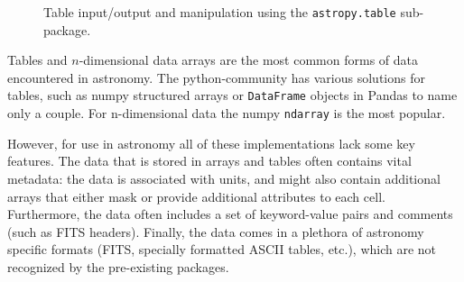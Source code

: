 \documentclass[traditabstract]{aa}
\begin{document}
\begin{figure}
\center
\caption{Table input/output and manipulation using the \texttt{astropy.table}
sub-package.\label{code:tables}}
\vspace{0.1in}
\end{figure}

Tables and $n$-dimensional data arrays are the most common forms of data
encountered in astronomy. The \gls{python}-community has various solutions for
tables, such as \gls{numpy} structured arrays or \texttt{DataFrame} objects in
Pandas \citep{pandas} to name only a couple. For
n-dimensional data the \gls{numpy} \texttt{ndarray} is the most popular.

However, for use in astronomy all of these implementations lack some key
features. The data that is stored in arrays and tables often contains vital
metadata: the data is associated with units, and might also contain additional
arrays that either mask or provide additional attributes to each cell.
Furthermore, the data often includes a set of keyword-value pairs and comments (such as FITS headers).
Finally, the data comes in a plethora of astronomy specific formats (FITS,
specially formatted ASCII tables, etc.), which are not recognized by the
pre-existing packages.
\end{document}
